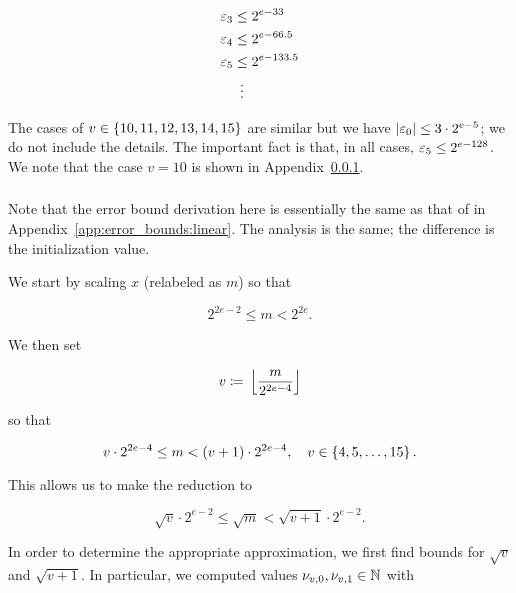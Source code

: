 \begin{itemize}
\begin{align}
    \varepsilon_{3} &\le 2^{e-33} \nonumber\\
    \varepsilon_{4} &\le 2^{e-66.5} \nonumber\\
    \varepsilon_{5} &\le 2^{e-133.5} \nonumber\\
        &\ \vdots
\end{align}

The cases of $v\in\left\{ 10, 11, 12, 13, 14, 15 \right\}$ are similar
but we have $\left| \varepsilon_{0} \right| \le 3\cdot2^{e-5}$;
we do not include the details.
The important fact is that, in all cases, $\varepsilon_{5}\le 2^{e-128}$.
We note that the case $v=10$ is shown in
Appendix~\ref{app:error_bounds:hyper4}.
\end{itemize}


\subsubsection{\HyperFour{}}
\label{app:error_bounds:hyper4}

Note that the error bound derivation here is essentially
the same as that of \Linear{} in Appendix~\ref{app:error_bounds:linear}.
The analysis is the same; the difference is the initialization value.

We start by scaling $x$ (relabeled as $m$) so that

\begin{equation}
    2^{2e-2} \le m < 2^{2e}.
\end{equation}

\noindent
We then set

\begin{equation}
    v \coloneqq{} \left\lfloor \frac{m}{2^{2e-4}} \right\rfloor
\end{equation}

\noindent
so that

\begin{equation}
    v\cdot2^{2e-4} \le m < \left( v+1 \right)\cdot2^{2e-4},
    \quad v\in\left\{ 4, 5, \dots, 15 \right\}.
\end{equation}

\noindent
This allows us to make the reduction to

\begin{equation}
    \sqrt{v}\cdot2^{e-2} \le \sqrt{m} < \sqrt{v+1}\cdot2^{e-2}.
    \label{eq:app_hyper4_m_bound}
\end{equation}

In order to determine the appropriate approximation,
we first find bounds for $\sqrt{v}$ and $\sqrt{v+1}$.
In particular, we computed values $\nu_{v,0}, \nu_{v,1}\in\mathbb{N}$ with

